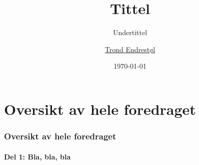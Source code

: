 
\def\jobname{navn} %
\setjobnamebeamerversion{\jobname}

\usepackage[utf8]{inputenc}
\usepackage[T1]{fontenc}
\usepackage[norsk]{babel}
\usepackage{booktabs}
\usepackage{multicol}
\usepackage{fancyvrb}


\hypersetup{colorlinks,linkcolor=,urlcolor=blue}

\newcommand{\Alert}[2]{\alert<#1>{#2}}
\newcommand{\Textbackslash}{\textbackslash\penalty\exhyphenpenalty}
\newcommand{\rfc}[1]{\href{http://tools.ietf.org/html/rfc#1}{RFC~#1}}
\newcommand{\prfc}[1]{(\rfc{#1})}

\title{\textbf{Tittel}}
\subtitle{Undertittel}
\author[T.~Endrestøl]{\href{http://fig.ol.no/~trond/}{Trond Endrestøl}}
\subject{Emne for bruk i egenskapene til PDF-fila}
\date{\today} %



\begin{frame}
  \titlepage
\end{frame}

\section*{Oversikt av hele foredraget}
\begin{frame}%
  \frametitle{Oversikt av hele foredraget}
  \framesubtitle{Del 1: Bla, bla, bla}
  \tableofcontents[part=1]%
\end{frame}

